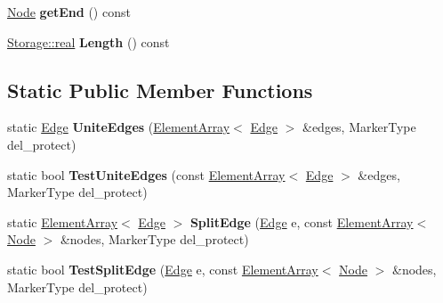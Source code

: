 \begin{DoxyCompactItemize}
\item 
\hypertarget{classINMOST_1_1Edge_a70191d91caf80e248728814c65f32573}{\hyperlink{classINMOST_1_1Node}{Node} {\bfseries get\-End} () const }\label{classINMOST_1_1Edge_a70191d91caf80e248728814c65f32573}

\item 
\hypertarget{classINMOST_1_1Edge_a5fe21d1ca8c154a833b87cd8ee257b42}{\hyperlink{classINMOST_1_1Storage_a853346784b4a5822a7fac54d8f10f805}{Storage\-::real} {\bfseries Length} () const }\label{classINMOST_1_1Edge_a5fe21d1ca8c154a833b87cd8ee257b42}

\end{DoxyCompactItemize}
\subsection*{Static Public Member Functions}
\begin{DoxyCompactItemize}
\item 
\hypertarget{classINMOST_1_1Edge_a7c11107844dad9c11946e26d079ef457}{static \hyperlink{classINMOST_1_1Edge}{Edge} {\bfseries Unite\-Edges} (\hyperlink{classINMOST_1_1ElementArray}{Element\-Array}$<$ \hyperlink{classINMOST_1_1Edge}{Edge} $>$ \&edges, Marker\-Type del\-\_\-protect)}\label{classINMOST_1_1Edge_a7c11107844dad9c11946e26d079ef457}

\item 
\hypertarget{classINMOST_1_1Edge_aca593e1b64452350f6adc6e8838f1877}{static bool {\bfseries Test\-Unite\-Edges} (const \hyperlink{classINMOST_1_1ElementArray}{Element\-Array}$<$ \hyperlink{classINMOST_1_1Edge}{Edge} $>$ \&edges, Marker\-Type del\-\_\-protect)}\label{classINMOST_1_1Edge_aca593e1b64452350f6adc6e8838f1877}

\item 
\hypertarget{classINMOST_1_1Edge_a9895ad12b476e4a7e8f57a7ae1d8d32b}{static \hyperlink{classINMOST_1_1ElementArray}{Element\-Array}$<$ \hyperlink{classINMOST_1_1Edge}{Edge} $>$ {\bfseries Split\-Edge} (\hyperlink{classINMOST_1_1Edge}{Edge} e, const \hyperlink{classINMOST_1_1ElementArray}{Element\-Array}$<$ \hyperlink{classINMOST_1_1Node}{Node} $>$ \&nodes, Marker\-Type del\-\_\-protect)}\label{classINMOST_1_1Edge_a9895ad12b476e4a7e8f57a7ae1d8d32b}

\item 
\hypertarget{classINMOST_1_1Edge_a1c492e4e1cdf20810332a5f4f0cf4605}{static bool {\bfseries Test\-Split\-Edge} (\hyperlink{classINMOST_1_1Edge}{Edge} e, const \hyperlink{classINMOST_1_1ElementArray}{Element\-Array}$<$ \hyperlink{classINMOST_1_1Node}{Node} $>$ \&nodes, Marker\-Type del\-\_\-protect)}\label{classINMOST_1_1Edge_a1c492e4e1cdf20810332a5f4f0cf4605}

\end{DoxyCompactItemize}
